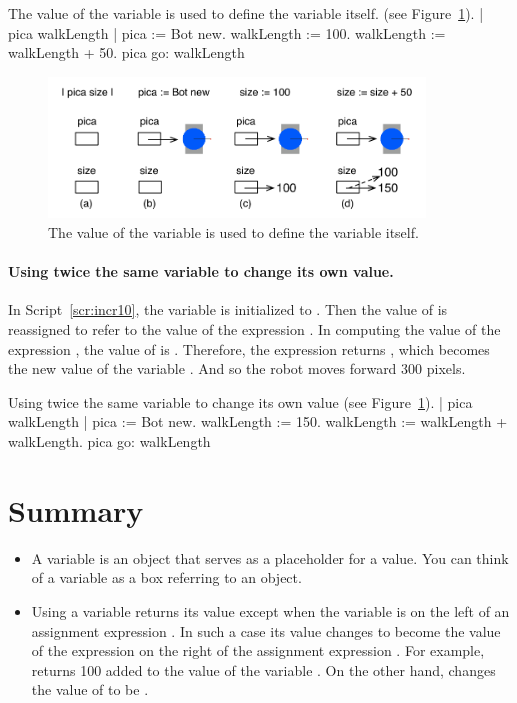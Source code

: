 \documentclass[a4paper,10pt,twoside]{book}
\begin{document}
\begin{script}[incr9]{The value of the variable  is used to define the variable itself.  (see Figure~\ref{fig:boxOne4}).}
	| pica walkLength | 
	pica := Bot new. 
	walkLength := 100. 
	walkLength := walkLength + 50. 
	pica go: walkLength
\end{script}

\begin{figure}[h]
	\centerline{\includegraphics[width=10cm]{boxFour}}
	\caption{The value of the variable  is used to define the variable itself.  
	\label{fig:boxOne4}}
\end{figure}



\paragraph{Using twice the same variable to change its own value.}
In Script~\ref{scr:incr10}, the variable  is initialized to . Then the value of  is reassigned to refer to the value of the expression . In computing the value of the expression , the value of  is . Therefore, the expression returns , which becomes the new value of the variable . And so  the robot moves forward 300 pixels.


\begin{script}[incr10]{Using twice the same variable to change its own value (see Figure~\ref{fig:boxOne4}).}
	| pica walkLength | 
	pica := Bot new. 
	walkLength := 150. 
	walkLength := walkLength + walkLength. 
	pica go: walkLength 
\end{script}


\section*{Summary}

\begin{itemize}
\item A variable is an object that serves as a placeholder for a value. You can think of a variable as a box referring to an object. 

\item Using a variable returns its value except when the variable is on the left of an assignment expression \ct{:=}. In such a case its value changes to become the value of the expression on the right of the assignment expression \ct{:=}. For example,  returns 100 added to the value of the variable . On the other hand,  changes the value of  to be . 
\end{itemize}

\ifx\wholebook\relax\else
    
\end{document}
